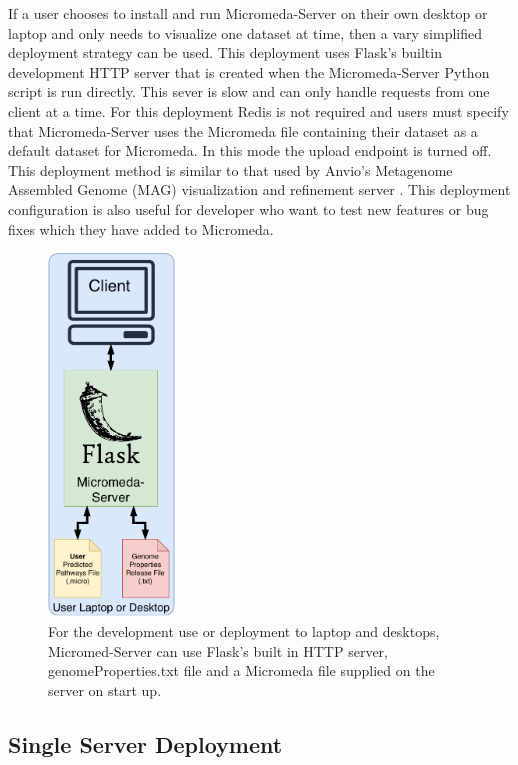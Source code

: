 If a user chooses to install and run Micromeda-Server on their own desktop or laptop and only needs to visualize one dataset at time, then a vary simplified deployment strategy can be used. This deployment uses Flask's builtin development HTTP server that is created when the Micromeda-Server Python script is run directly. This sever is slow and can only handle requests from one client at a time. For this deployment Redis is not required and users must specify that Micromeda-Server uses the Micromeda file containing their dataset as a default dataset for Micromeda. In this mode the upload endpoint is turned off. This deployment method is similar to that used by Anvio's Metagenome Assembled Genome (MAG) visualization and refinement server \cite{eren2015anvi}. This deployment configuration is also useful for developer who want to test new features or bug fixes which they have added to Micromeda.

\begin{figure}[!ht]
  \centering
	\includegraphics[width=0.30\textwidth]{media/micromeda-simple-deployment.pdf}
	 \caption{For the development use or deployment to laptop and desktops, Micromed-Server can use Flask's built in HTTP server, genomeProperties.txt file and a Micromeda file supplied on the server on start up.}
	 \label{fig:micromeda-small-deploy}
\end{figure}

\subsection{Single Server Deployment}

